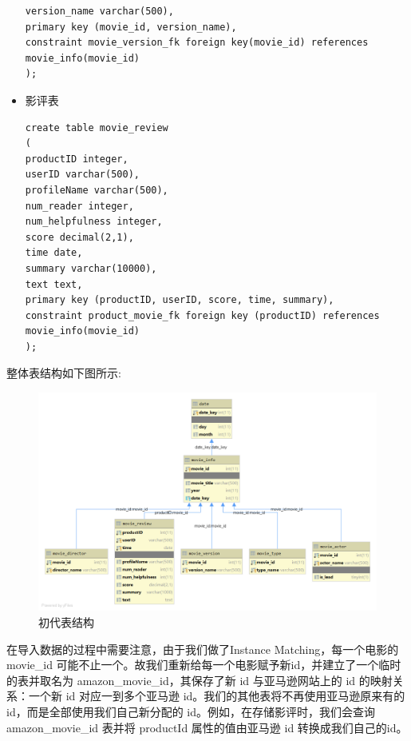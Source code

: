 \documentclass{ctexrep}
\begin{document}
\begin{itemize}
\begin{lstlisting}
version_name varchar(500),
primary key (movie_id, version_name),
constraint movie_version_fk foreign key(movie_id) references movie_info(movie_id)
);
            \end{lstlisting}
        \item 影评表
            \begin{lstlisting}
create table movie_review
(
productID integer,
userID varchar(500),
profileName varchar(500),
num_reader integer,
num_helpfulness integer,
score decimal(2,1),
time date,
summary varchar(10000),
text text,
primary key (productID, userID, score, time, summary),
constraint product_movie_fk foreign key (productID) references movie_info(movie_id)
);
            \end{lstlisting}
	\end{itemize}
    整体表结构如下图所示:
    \begin{figure}[H]
		\centering
		\includegraphics[width=0.7\linewidth]{img/MySQL_DB1.png}
		\caption{初代表结构}
		\label{fig:MySQL_DB1}
	\end{figure}
	在导入数据的过程中需要注意，由于我们做了Instance Matching，每一个电影的 movie\_id 可能不止一个。故我们重新给每一个电影赋予新id，并建立了一个临时的表并取名为 amazon\_movie\_id，其保存了新 id 与亚马逊网站上的 id 的映射关系：一个新 id 对应一到多个亚马逊 id。我们的其他表将不再使用亚马逊原来有的 id，而是全部使用我们自己新分配的 id。例如，在存储影评时，我们会查询 amazon\_movie\_id 表并将 productId 属性的值由亚马逊 id 转换成我们自己的id。
\end{document}
